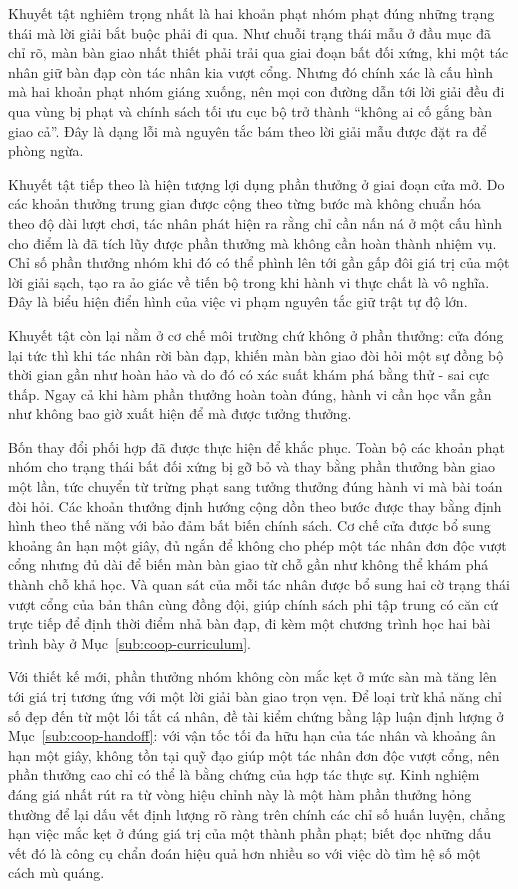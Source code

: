 \indent Khuyết tật nghiêm trọng nhất là hai khoản phạt nhóm phạt đúng những trạng
thái mà lời giải bắt buộc phải đi qua. Như chuỗi trạng thái mẫu ở đầu mục đã chỉ rõ,
màn bàn giao nhất thiết phải trải qua giai đoạn bất đối xứng, khi một tác nhân giữ bàn
đạp còn tác nhân kia vượt cổng. Nhưng đó chính xác là cấu hình mà hai khoản phạt nhóm
giáng xuống, nên mọi con đường dẫn tới lời giải đều đi qua vùng bị phạt và chính sách
tối ưu cục bộ trở thành ``không ai cố gắng bàn giao cả''. Đây là dạng lỗi mà nguyên tắc
bám theo lời giải mẫu được đặt ra để phòng ngừa.

\indent Khuyết tật tiếp theo là hiện tượng lợi dụng phần thưởng ở giai đoạn cửa mở. Do
các khoản thưởng trung gian được cộng theo từng bước mà không chuẩn hóa theo độ dài lượt
chơi, tác nhân phát hiện ra rằng chỉ cần nấn ná ở một cấu hình cho điểm là đã tích lũy
được phần thưởng mà không cần hoàn thành nhiệm vụ. Chỉ số phần thưởng nhóm khi đó có thể
phình lên tới gần gấp đôi giá trị của một lời giải sạch, tạo ra ảo giác về tiến bộ trong
khi hành vi thực chất là vô nghĩa. Đây là biểu hiện điển hình của việc vi phạm nguyên
tắc giữ trật tự độ lớn.

\indent Khuyết tật còn lại nằm ở cơ chế môi trường chứ không ở phần thưởng: cửa đóng lại
tức thì khi tác nhân rời bàn đạp, khiến màn bàn giao đòi hỏi một sự đồng bộ thời gian
gần như hoàn hảo và do đó có xác suất khám phá bằng thử - sai cực thấp. Ngay cả khi hàm
phần thưởng hoàn toàn đúng, hành vi cần học vẫn gần như không bao giờ xuất hiện để mà
được tưởng thưởng.

\indent Bốn thay đổi phối hợp đã được thực hiện để khắc phục. Toàn bộ các khoản phạt
nhóm cho trạng thái bất đối xứng bị gỡ bỏ và thay bằng phần thưởng bàn giao một lần, tức
chuyển từ trừng phạt sang tưởng thưởng đúng hành vi mà bài toán đòi hỏi. Các khoản
thưởng định hướng cộng dồn theo bước được thay bằng định hình theo thế năng
\cite{ng1999policy} với bảo đảm bất biến chính sách. Cơ chế cửa được bổ sung khoảng ân
hạn một giây, đủ ngắn để không cho phép một tác nhân đơn độc vượt cổng nhưng đủ dài để
biến màn bàn giao từ chỗ gần như không thể khám phá thành chỗ khả học. Và quan sát của
mỗi tác nhân được bổ sung hai cờ trạng thái vượt cổng của bản thân cùng đồng đội, giúp
chính sách phi tập trung có căn cứ trực tiếp để định thời điểm nhả bàn đạp, đi kèm một
chương trình học hai bài trình bày ở Mục~\ref{sub:coop-curriculum}.

\indent Với thiết kế mới, phần thưởng nhóm không còn mắc kẹt ở mức sàn mà tăng lên tới
giá trị tương ứng với một lời giải bàn giao trọn vẹn. Để loại trừ khả năng chỉ số đẹp
đến từ một lối tắt cá nhân, đề tài kiểm chứng bằng lập luận định lượng ở
Mục~\ref{sub:coop-handoff}: với vận tốc tối đa hữu hạn của tác nhân và khoảng ân hạn một
giây, không tồn tại quỹ đạo giúp một tác nhân đơn độc vượt cổng, nên phần thưởng cao chỉ
có thể là bằng chứng của hợp tác thực sự. Kinh nghiệm đáng giá nhất rút ra từ vòng hiệu
chỉnh này là một hàm phần thưởng hỏng thường để lại dấu vết định lượng rõ ràng trên
chính các chỉ số huấn luyện, chẳng hạn việc mắc kẹt ở đúng giá trị của một thành phần
phạt; biết đọc những dấu vết đó là công cụ chẩn đoán hiệu quả hơn nhiều so với việc dò
tìm hệ số một cách mù quáng.

